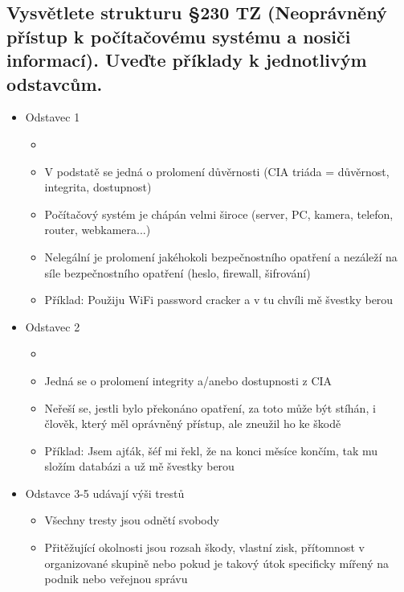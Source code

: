 \subsection{Vysvětlete strukturu §230 TZ (Neoprávněný přístup k počítačovému systému a nosiči informací). Uveďte příklady k jednotlivým odstavcům.}
\begin{itemize}
    \item Odstavec 1
    \begin{itemize}
        \item \textit{}
        \item V podstatě se jedná o prolomení důvěrnosti (CIA triáda = důvěrnost, integrita, dostupnost)
        \item Počítačový systém je chápán velmi široce (server, PC, kamera, telefon, router, webkamera...)
        \item Nelegální je prolomení jakéhokoli bezpečnostního opatření a nezáleží na síle bezpečnostního opatření (heslo, firewall, šifrování)
        \item Příklad: Použiju WiFi password cracker a v tu chvíli mě švestky berou
    \end{itemize}
    \item Odstavec 2
    \begin{itemize}
        \item \textit{}
        \item Jedná se o prolomení integrity a/anebo dostupnosti z CIA
        \item Neřeší se, jestli bylo překonáno opatření, za toto může být stíhán, i člověk, který měl oprávněný přístup, ale zneužil ho ke škodě
        \item Příklad: Jsem ajťák, šéf mi řekl, že na konci měsíce končím, tak mu složím databázi a už mě švestky berou
    \end{itemize}
    \item Odstavce 3-5 udávají výši trestů
    \begin{itemize}
        \item Všechny tresty jsou odnětí svobody
        \item Přitěžující okolnosti jsou rozsah škody, vlastní zisk, přítomnost v organizované skupině nebo pokud je takový útok specificky mířený na podnik nebo veřejnou správu
    \end{itemize}
\end{itemize}
